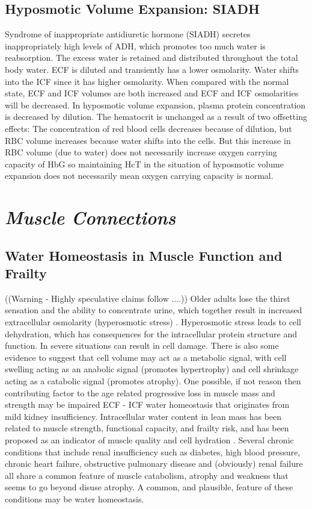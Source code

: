 \subsection{Hyposmotic Volume Expansion: SIADH} 

Syndrome of inappropriate antidiuretic hormone (SIADH) secretes inappropriately high levels of ADH, which promotes too much water is reabsorption. The excess water is retained and distributed throughout the total body water. ECF is diluted and transiently has a lower osmolarity. Water shifts into the ICF since it has higher osmolarity. When compared with the normal state, ECF and ICF volumes are both increased and ECF and ICF osmolarities will be decreased. In hyposmotic volume expansion, plasma protein concentration is decreased by dilution. The hematocrit is unchanged as a result of two offsetting effects: The concentration of red blood cells decreases because of dilution, but RBC volume increases because water shifts into the cells. But this increase in RBC volume (due to water) does not necessarily increase oxygen carrying capacity of HbG so maintaining HcT in the situation of hyposmotic volume expansion does not necessarily mean oxygen carrying capacity is normal.



\section{\textit{Muscle Connections}}

\subsection{Water Homeostasis in Muscle Function and Frailty}
((Warning - Highly speculative claims follow ....)) Older adults lose the thirst sensation and the ability to concentrate urine, which together result in increased extracellular osmolarity (hyperosmotic stress) \cite{lorenzo_role_2019}. Hyperosmotic stress leads to cell dehydration, which has consequences for the intracellular protein structure and function. In severe situations can result in cell damage. There is also some evidence to suggest that cell volume may act as a metabolic signal, with cell swelling acting as an anabolic signal (promotes hypertrophy) and cell shrinkage acting as a catabolic signal (promotes atrophy). One possible, if not reason then contributing factor to the age related progressive loss in muscle mass and strength may be impaired ECF - ICF water homeostasis that originates from mild kidney insufficiency. Intracellular water content in lean mass has been related to muscle strength, functional capacity, and frailty risk, and has been proposed as an indicator of muscle quality and cell hydration \cite{lorenzo_role_2019}. Several chronic conditions that include renal insufficiency such as diabetes, high blood pressure, chronic heart failure, obstructive pulmonary disease and (obviously) renal failure all share a common feature of muscle catabolism, atrophy and weakness that seems to go beyond disuse atrophy. A common, and plausible, feature of these conditions may be water homeostasis. 


